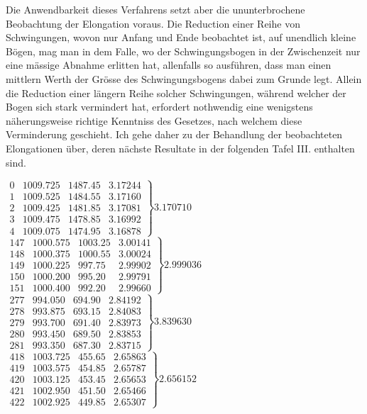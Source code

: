 Die Anwendbarkeit dieses Verfahrens setzt aber die ununterbrochene Beobachtung der Elongation voraus. Die Reduction einer Reihe von Schwingungen, wovon nur Anfang und Ende beobachtet ist, auf unendlich kleine Bögen, mag man in dem Falle, wo der Schwingungsbogen in der Zwischenzeit nur eine mässige Abnahme erlitten hat, allenfalls so ausführen, dass man einen mittlern Werth der Grösse des Schwingungsbogens dabei zum Grunde legt. Allein die Reduction einer längern Reihe solcher Schwingungen, während welcher der Bogen sich stark vermindert hat, erfordert nothwendig eine wenigstens näherungsweise richtige
Kenntniss des Gesetzes, nach welchem diese Verminderung geschieht. Ich gehe daher zu der Behandlung der beobachteten Elongationen über, deren nächste Resultate in der folgenden Tafel III. enthalten sind.
\begin{center}
\fontsize{9}{11}\selectfont
$\left.\begin{array}{r|r|r|r}
0&1009.725&1487.45&3.17244\\
1&1009.525&1484.55&3.17160\\
2&1009.425&1481.85&3.17081\\
3&1009.475&1478.85&3.16992\\
4&1009.075&1474.95&3.16878
\end{array}\right\}3.170710$\\[6pt]
$\left.\begin{array}{r|r|r|r}
147&1000.575&1003.25&3.00141\\
148&1000.375&1000.55&3.00024\\
149&1000.225&997.75&2.99902\\
150&1000.200&995.20&2.99791\\
151&1000.400&992.20&2.99660
\end{array}\right\}2.999036$\\[6pt]
$\left.\begin{array}{r|r|r|r}
277&994.050&694.90&2.84192\\
278&993.875&693.15&2.84083\\
279&993.700&691.40&2.83973\\
280&993.450&689.50&2.83853\\
281&993.350&687.30&2.83715
\end{array}\right\}3.839630$\\[6pt]
$\left.\begin{array}{r|r|r|r}
418&1003.725&455.65&2.65863\\
419&1003.575&454.85&2.65787\\
420&1003.125&453.45&2.65653\\
421&1002.950&451.50&2.65466\\
422&1002.925&449.85&2.65307
\end{array}\right\}2.656152$
\end{center}

